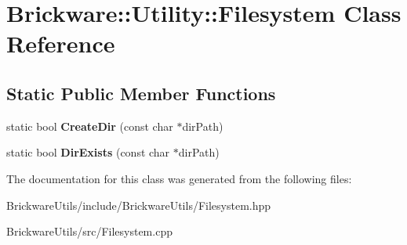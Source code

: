 \hypertarget{classBrickware_1_1Utility_1_1Filesystem}{}\section{Brickware\+:\+:Utility\+:\+:Filesystem Class Reference}
\label{classBrickware_1_1Utility_1_1Filesystem}
\subsection*{Static Public Member Functions}
\begin{DoxyCompactItemize}
\item 
\hypertarget{classBrickware_1_1Utility_1_1Filesystem_a33e682ba3ec2ea3a0f803c041835d004}{}static bool {\bfseries Create\+Dir} (const char $\ast$dir\+Path)\label{classBrickware_1_1Utility_1_1Filesystem_a33e682ba3ec2ea3a0f803c041835d004}

\item 
\hypertarget{classBrickware_1_1Utility_1_1Filesystem_a90b1ebaf2f3f8743beae752cb7da5ba7}{}static bool {\bfseries Dir\+Exists} (const char $\ast$dir\+Path)\label{classBrickware_1_1Utility_1_1Filesystem_a90b1ebaf2f3f8743beae752cb7da5ba7}

\end{DoxyCompactItemize}


The documentation for this class was generated from the following files\+:\begin{DoxyCompactItemize}
\item 
Brickware\+Utils/include/\+Brickware\+Utils/Filesystem.\+hpp\item 
Brickware\+Utils/src/Filesystem.\+cpp\end{DoxyCompactItemize}
